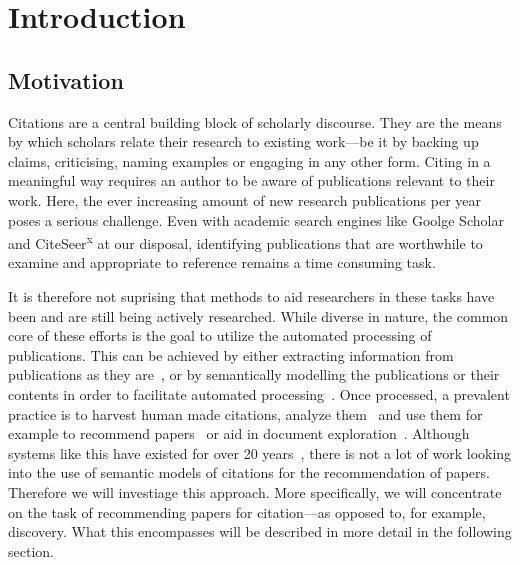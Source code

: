 \chapter{Introduction}\label{chap:introduction}
\section{Motivation}
Citations are a central building block of scholarly discourse. They are the means by which scholars relate their research to existing work---be it by backing up claims, criticising, naming examples or engaging in any other form. Citing in a meaningful way requires an author to be aware of publications relevant to their work.
Here, the ever increasing amount of new research publications per year poses a serious challenge. Even with academic search engines like Goolge Scholar and CiteSeer\textsuperscript{x} at our disposal, identifying publications that are worthwhile to examine and appropriate to reference remains a time consuming task.

It is therefore not suprising that methods to aid researchers in these tasks have been and are still being actively researched. While diverse in nature, the common core of these efforts is the goal to utilize the automated processing of publications. This can be achieved by either extracting information from publications as they are~\cite{Nasar2018,Beel2016}, or by semantically modelling the publications or their contents in order to facilitate automated processing~\cite{BuckinghamShum2000,Peroni2012,Huh2014,Jaradeh2019}. %
Once processed, a prevalent practice is to harvest human made citations, analyze them~\cite{Abujbara2013,Teufel2006a} and use them for example to recommend papers~\cite{Beel2016} or aid in document exploration~\cite{Berger2016}. Although systems like this have existed for over 20 years~\cite{Bollacker1998,Beel2016}, there is not a lot of work looking into the use of semantic models of citations for the recommendation of papers.
Therefore we will investiage this approach. More specifically, we will concentrate on the task of recommending papers for citation---as opposed to, for example, discovery. What this encompasses will be described in more detail in the following section.

